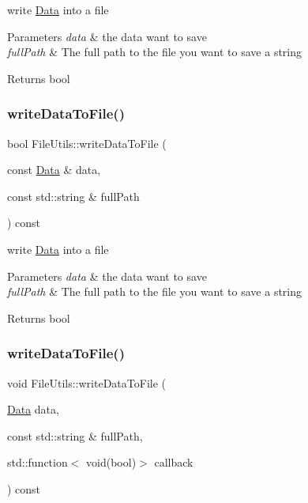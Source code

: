 write \hyperlink{classData}{Data} into a file


\begin{DoxyParams}{Parameters}
{\em data} & the data want to save \\
\hline
{\em full\+Path} & The full path to the file you want to save a string \\
\hline
\end{DoxyParams}
\begin{DoxyReturn}{Returns}
bool 
\end{DoxyReturn}
\mbox{\label{classFileUtils_a8b88ed03982d6aec3008baba5345f323}} 
\subsubsection{\texorpdfstring{write\+Data\+To\+File()}{writeDataToFile()}\hspace{0.1cm}{\footnotesize\ttfamily [2/3]}}
{\footnotesize\ttfamily bool File\+Utils\+::write\+Data\+To\+File (\begin{DoxyParamCaption}\item[{const \hyperlink{classData}{Data} \&}]{data,  }\item[{const std\+::string \&}]{full\+Path }\end{DoxyParamCaption}) const\hspace{0.3cm}{\ttfamily [virtual]}}

write \hyperlink{classData}{Data} into a file


\begin{DoxyParams}{Parameters}
{\em data} & the data want to save \\
\hline
{\em full\+Path} & The full path to the file you want to save a string \\
\hline
\end{DoxyParams}
\begin{DoxyReturn}{Returns}
bool 
\end{DoxyReturn}
\mbox{\label{classFileUtils_a5c32f11d009af2cab29b9f0fcb20b43a}} 
\subsubsection{\texorpdfstring{write\+Data\+To\+File()}{writeDataToFile()}\hspace{0.1cm}{\footnotesize\ttfamily [3/3]}}
{\footnotesize\ttfamily void File\+Utils\+::write\+Data\+To\+File (\begin{DoxyParamCaption}\item[{\hyperlink{classData}{Data}}]{data,  }\item[{const std\+::string \&}]{full\+Path,  }\item[{std\+::function$<$ void(bool)$>$}]{callback }\end{DoxyParamCaption}) const\hspace{0.3cm}{\ttfamily [virtual]}}

